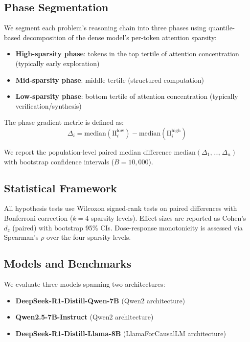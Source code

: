 \documentclass[11pt,a4paper]{article}
\begin{document}
\subsection{Phase Segmentation}

We segment each problem's reasoning chain into three phases using quantile-based decomposition of the dense model's per-token attention sparsity:
\begin{itemize}
\item \textbf{High-sparsity phase}: tokens in the top tertile of attention concentration (typically early exploration)
\item \textbf{Mid-sparsity phase}: middle tertile (structured computation)
\item \textbf{Low-sparsity phase}: bottom tertile of attention concentration (typically verification/synthesis)
\end{itemize}

The phase gradient metric is defined as:
\begin{equation}
\Delta_i = \text{median}(\text{II}_{i}^{\text{low}}) - \text{median}(\text{II}_{i}^{\text{high}})
\end{equation}

We report the population-level paired median difference $\text{median}(\Delta_1, \ldots, \Delta_n)$ with bootstrap confidence intervals ($B = 10{,}000$).

\subsection{Statistical Framework}

All hypothesis tests use Wilcoxon signed-rank tests on paired differences with Bonferroni correction ($k = 4$ sparsity levels). Effect sizes are reported as Cohen's $d_z$ (paired) with bootstrap 95\% CIs. Dose-response monotonicity is assessed via Spearman's $\rho$ over the four sparsity levels.

\subsection{Models and Benchmarks}

We evaluate three models spanning two architectures:
\begin{itemize}
\item \textbf{DeepSeek-R1-Distill-Qwen-7B} (Qwen2 architecture)
\item \textbf{Qwen2.5-7B-Instruct} (Qwen2 architecture)
\item \textbf{DeepSeek-R1-Distill-Llama-8B} (LlamaForCausalLM architecture)
\end{itemize}
\end{document}
